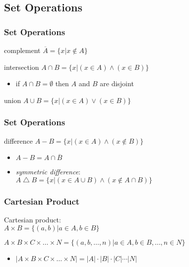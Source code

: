 \documentclass[dvipsnames]{beamer}
\begin{document}
\subsection{Set Operations}

\begin{frame}
  \frametitle{Set Operations}

  \begin{block}{complement}
    $\overline{A} = \{ x | x \notin A \} $
  \end{block}

  \pause
  \begin{block}{intersection}
    $A \cap B = \{ x | (x \in A) \wedge (x \in B) \}$

    \begin{itemize}
      \item if $A \cap B = \emptyset$ then $A$ and $B$ are \alert{disjoint}
    \end{itemize}
  \end{block}

  \pause
  \begin{block}{union}
    $A \cup B = \{ x | (x \in A) \vee (x \in B) \}$
  \end{block}
\end{frame}

\begin{frame}
  \frametitle{Set Operations}

  \begin{block}{difference}
    $A - B = \{ x | (x \in A) \wedge (x \notin B) \}$

    \pause
    \begin{itemize}
      \item $A-B = A \cap \overline{B}$

      \pause
      \item \emph{symmetric difference}:\\
        $A \bigtriangleup B = \{ x | (x \in A \cup B)
                              \wedge (x \notin A \cap B) \}$
    \end{itemize}
  \end{block}
\end{frame}

\begin{frame}
  \frametitle{Cartesian Product}

  \begin{definition}
    \alert{Cartesian product}:\\
      $A \times B = \{(a,b) | a \in A, b \in B\}$

      \medskip
      $A \times B \times C \times \dots \times N =
        \{(a,b,\ldots,n) | a \in A, b \in B, \ldots, n \in N\}$
  \end{definition}

  \pause
  \medskip
  \begin{itemize}
    \item $|A \times B \times C \times \dots \times N| =
      |A| \cdot |B| \cdot |C| \cdots|N|$
  \end{itemize}
\end{frame}
\end{document}
